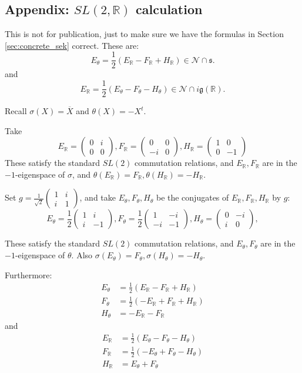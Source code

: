 \documentclass[10pt,leqno]{article}
\newcommand{\R}{\mathbb R}
\newcommand{\N}{\mathcal N}
\newcommand{\g}{\mathfrak g}
\newcommand{\s}{\mathfrak s}
\begin{document}
\subsection{Appendix: $SL(2,\R)$ calculation}

This is not for publication, just to make sure we have the formulas in Section \ref{sec:concrete_sek} correct.
These are:
$$
E_\theta=\frac12(E_\R-F_\R+H_\R)\in \N\cap \s.
$$
and
$$
E_\R=\frac 12(E_\theta-F_\theta-H_\theta)\in\N\cap i\g(\R).
$$

Recall $\sigma(X)=\overline X$ and $\theta(X)=-X^t$.

Take
$$
E_\R=\begin{pmatrix}0&i\\0&0\end{pmatrix},
F_\R=\begin{pmatrix}0&0\\-i&0\end{pmatrix},
H_\R=\begin{pmatrix}1&0\\0&-1\end{pmatrix}
$$
These satisfy the standard $SL(2)$ commutation relations, and $E_\R,F_\R$ are in the $-1$-eigenspace of $\sigma$,
and $\theta(E_\R)=F_\R, \theta(H_\R)=-H_\R$.

Set $g=\frac 1{\sqrt 2}\begin{pmatrix}1&i\\i&1
\end{pmatrix}$, and take $E_\theta,F_\theta,H_\theta$ be the conjugates of $E_\R,F_\R,H_\R$ by $g$:
$$
E_\theta=\frac12\begin{pmatrix}1&i\\i&-1\end{pmatrix},
F_\theta=\frac12\begin{pmatrix}1&-i\\-i&-1\end{pmatrix},
H_\theta=\begin{pmatrix}0&-i\\i&0\end{pmatrix},
$$


These satisfy the standard $SL(2)$ commutation relations, and $E_\theta,F_\theta$ are in the $-1$-eigenspace of $\theta$.
Also $\sigma(E_\theta)=F_\theta,\sigma(H_\theta)=-H_\theta$.

Furthermore:
$$
\begin{aligned}
  E_\theta&=\frac12(E_\R-F_\R+H_\R)\\
  F_\theta&=\frac12(-E_\R+F_\R+H_\R)\\
  H_\theta&=-E_\R-F_\R
\end{aligned}
$$
and
$$
\begin{aligned}
  E_\R&=\frac12(E_\theta-F_\theta-H_\theta)\\
  F_\R&=\frac12(-E_\theta+F_\theta-H_\theta)\\
  H_\R&=E_\theta+F_\theta
\end{aligned}
$$





\end{document}
